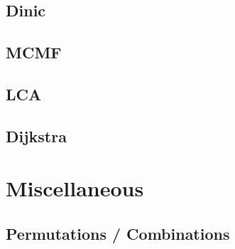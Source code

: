 \documentclass[10pt,landscape,a4paper,twocolumn]{article}
\begin{document}
\subsection{Dinic}


\subsection{MCMF}


\subsection{LCA}


\subsection{Dijkstra}


\section{Miscellaneous}
\subsection{Permutations / Combinations}

\end{document}
